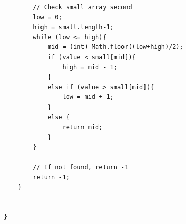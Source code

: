 \documentclass[11pt]{article}
\begin{document}
\begin{lstlisting}
        // Check small array second
        low = 0;
        high = small.length-1;
        while (low <= high){
            mid = (int) Math.floor((low+high)/2);
            if (value < small[mid]){
                high = mid - 1;
            }
            else if (value > small[mid]){
                low = mid + 1;
            }
            else {
                return mid;
            }
        }

        // If not found, return -1
        return -1;
    }


}
\end{lstlisting}
\end{document}
